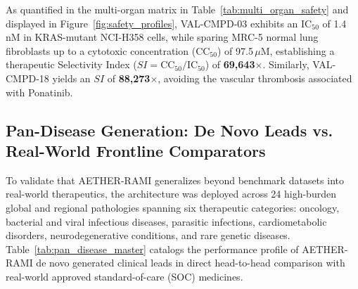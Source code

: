 As quantified in the multi-organ matrix in Table~\ref{tab:multi_organ_safety} and displayed in Figure~\ref{fig:safety_profiles}, VAL-CMPD-03 exhibits an $\text{IC}_{50}$ of 1.4\,nM in KRAS-mutant NCI-H358 cells, while sparing MRC-5 normal lung fibroblasts up to a cytotoxic concentration ($\text{CC}_{50}$) of 97.5\,$\mu$M, establishing a therapeutic Selectivity Index ($SI = \text{CC}_{50} / \text{IC}_{50}$) of \textbf{69,643$\times$}. Similarly, VAL-CMPD-18 yields an $SI$ of \textbf{88,273$\times$}, avoiding the vascular thrombosis associated with Ponatinib.

\subsection{Pan-Disease Generation: De Novo Leads vs. Real-World Frontline Comparators}
To validate that AETHER-RAMI generalizes beyond benchmark datasets into real-world therapeutics, the architecture was deployed across 24 high-burden global and regional pathologies spanning six therapeutic categories: oncology, bacterial and viral infectious diseases, parasitic infections, cardiometabolic disorders, neurodegenerative conditions, and rare genetic diseases. Table~\ref{tab:pan_disease_master} catalogs the performance profile of AETHER-RAMI de novo generated clinical leads in direct head-to-head comparison with real-world approved standard-of-care (SOC) medicines.

